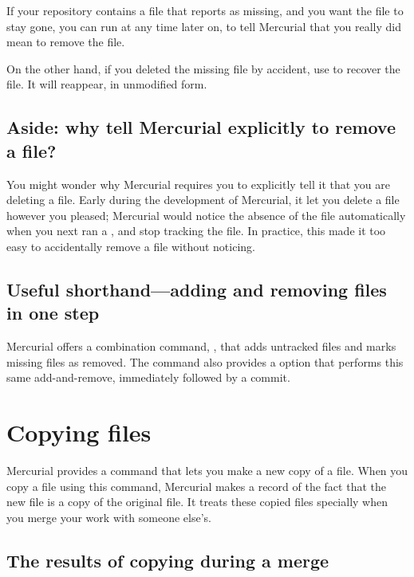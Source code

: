 If your repository contains a file that  reports as
missing, and you want the file to stay gone, you can run
 at any time later on, to
tell Mercurial that you really did mean to remove the file.

On the other hand, if you deleted the missing file by accident, use
 to recover the file.  It will
reappear, in unmodified form.

\subsection{Aside: why tell Mercurial explicitly to 
  remove a file?}

You might wonder why Mercurial requires you to explicitly tell it that
you are deleting a file.  Early during the development of Mercurial,
it let you delete a file however you pleased; Mercurial would notice
the absence of the file automatically when you next ran a
, and stop tracking the file.  In practice, this made it
too easy to accidentally remove a file without noticing.

\subsection{Useful shorthand---adding and removing files
  in one step}

Mercurial offers a combination command, , that adds
untracked files and marks missing files as removed.  
The  command also provides a  option
that performs this same add-and-remove, immediately followed by a
commit.

\section{Copying files}

Mercurial provides a  command that lets you make a new
copy of a file.  When you copy a file using this command, Mercurial
makes a record of the fact that the new file is a copy of the original
file.  It treats these copied files specially when you merge your work
with someone else's.

\subsection{The results of copying during a merge}

